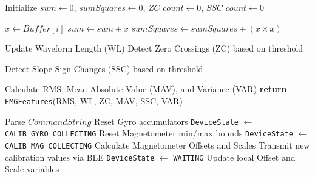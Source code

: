 \begin{algorithm}
\caption{Feature Extraction and BLE Calibration Command Processing}
\label{alg:feat_calib}
\begin{algorithmic}[1]
    \State Initialize $sum \gets 0$, $sumSquares \gets 0$, $ZC\_count \gets 0$, $SSC\_count \gets 0$
    
        \State $x \gets Buffer[i]$
        \State $sum \gets sum + x$
        \State $sumSquares \gets sumSquares + (x \times x)$
        
            \State Update Waveform Length (WL)
            \State Detect Zero Crossings (ZC) based on threshold
        \EndIf
        
            \State Detect Slope Sign Changes (SSC) based on threshold
        \EndIf
    \EndFor
    
    \State Calculate RMS, Mean Absolute Value (MAV), and Variance (VAR)
    \State \textbf{return} \texttt{EMGFeatures}(RMS, WL, ZC, MAV, SSC, VAR)
\EndFunction
\vspace{0.2cm}

    \State Parse $CommandString$
        \State Reset Gyro accumulators
        \State \texttt{DeviceState} $\gets$ \texttt{CALIB\_GYRO\_COLLECTING}
        \State Reset Magnetometer min/max bounds
        \State \texttt{DeviceState} $\gets$ \texttt{CALIB\_MAG\_COLLECTING}
        \State Calculate Magnetometer Offsets and Scales
        \State Transmit new calibration values via BLE
        \State \texttt{DeviceState} $\gets$ \texttt{WAITING}
        \State Update local Offset and Scale variables
    \EndIf
\EndProcedure
\end{algorithmic}
\end{algorithm}